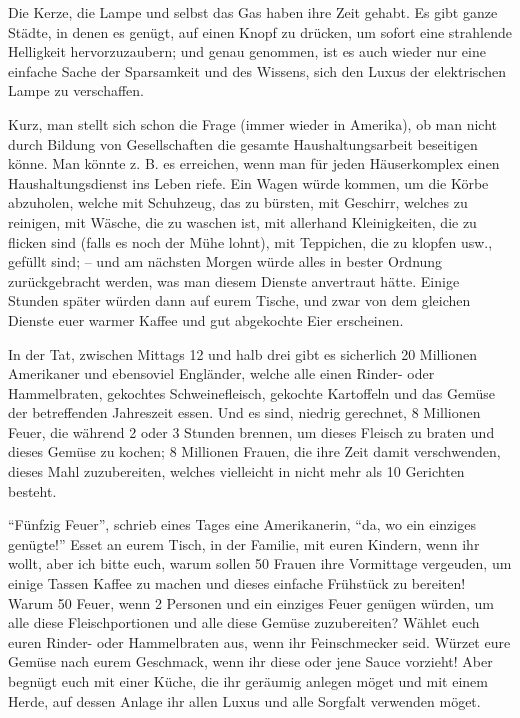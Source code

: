 \documentclass{scrbook}
\begin{document}
Die Kerze, die Lampe und selbst das Gas haben ihre Zeit gehabt. Es gibt ganze Städte, in denen es genügt, auf einen Knopf zu drücken, um sofort eine strahlende Helligkeit hervorzuzaubern; und genau genommen, ist es auch wieder nur eine einfache Sache der Sparsamkeit und des Wissens, sich den Luxus der elektrischen Lampe zu verschaffen.

Kurz, man stellt sich schon die Frage (immer wieder in Amerika), ob man nicht durch Bildung von Gesellschaften die gesamte Haushaltungsarbeit beseitigen könne. Man könnte z. B. es erreichen, wenn man für jeden Häuserkomplex einen Haushaltungsdienst ins Leben riefe. Ein Wagen würde kommen, um die Körbe abzuholen, welche mit Schuhzeug, das zu bürsten, mit Geschirr, welches zu reinigen, mit Wäsche, die zu waschen ist, mit allerhand Kleinigkeiten, die zu flicken sind (falls es noch der Mühe lohnt), mit Teppichen, die zu klopfen usw., gefüllt sind; – und am nächsten Morgen würde alles in bester Ordnung zurückgebracht werden, was man diesem Dienste anvertraut hätte. Einige Stunden später würden dann auf eurem Tische, und zwar von dem gleichen Dienste euer warmer Kaffee und gut abgekochte Eier erscheinen.

In der Tat, zwischen Mittags 12 und halb drei gibt es sicherlich 20 Millionen Amerikaner und ebensoviel Engländer, welche alle einen Rinder- oder Hammelbraten, gekochtes Schweinefleisch, gekochte Kartoffeln und das Gemüse der betreffenden Jahreszeit essen. Und es sind, niedrig gerechnet, 8 Millionen Feuer, die während 2 oder 3 Stunden brennen, um dieses Fleisch zu braten und dieses Gemüse zu kochen; 8 Millionen Frauen, die ihre Zeit damit verschwenden, dieses Mahl zuzubereiten, welches vielleicht in nicht mehr als 10 Gerichten besteht.

``Fünfzig Feuer'', schrieb eines Tages eine Amerikanerin, ``da, wo ein einziges genügte!'' Esset an eurem Tisch, in der Familie, mit euren Kindern, wenn ihr wollt, aber ich bitte euch, warum sollen 50 Frauen ihre Vormittage vergeuden, um einige Tassen Kaffee zu machen und dieses einfache Frühstück zu bereiten! Warum 50 Feuer, wenn 2 Personen und ein einziges Feuer genügen würden, um alle diese Fleischportionen und alle diese Gemüse zuzubereiten? Wählet euch euren Rinder- oder Hammelbraten aus, wenn ihr Feinschmecker seid. Würzet eure Gemüse nach eurem Geschmack, wenn ihr diese oder jene Sauce vorzieht! Aber begnügt euch mit einer Küche, die ihr geräumig anlegen möget und mit einem Herde, auf dessen Anlage ihr allen Luxus und alle Sorgfalt verwenden möget.
\end{document}
